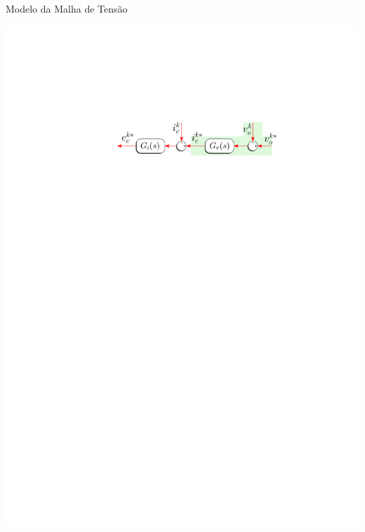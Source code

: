 \begin{frame}{Modelo da Malha de Tensão}



\centering
\includegraphics[width=0.65\linewidth]{./figuras/figuras_nrf/CTRL_V}


\begin{columns}

\centering

\vspace*{0.5cm}


\end{columns}
\end{frame}
